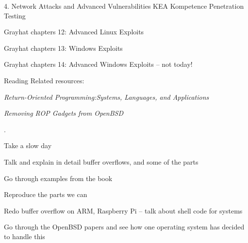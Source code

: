 \documentclass[Screen16to9,17pt]{foils}
\begin{document}
\mytitlepage
{4. Network Attacks and Advanced Vulnerabilities}
{KEA Kompetence Penetration Testing}









\begin{list2}
\item Grayhat chapters 12: Advanced Linux Exploits
\item Grayhat chapters 13: Windows Exploits
\item Grayhat chapters 14: Advanced Windows Exploits -- not today!
\end{list2}

Reading Related resources:
\begin{list2}
\item \emph{Return-Oriented Programming:Systems, Languages, and Applications}
\item \emph{Removing ROP Gadgets from OpenBSD}
\end{list2}




.

\begin{list1}
\item Take a slow day
\item Talk and explain in detail buffer overflows, and some of the parts
\item Go through examples from the book
\item Reproduce the parts we can
\item Redo buffer overflow on ARM, Raspberry Pi -- talk about shell code for systems
\item Go through the OpenBSD papers and see how one operating system has decided to handle this
\end{list1}
\end{document}
